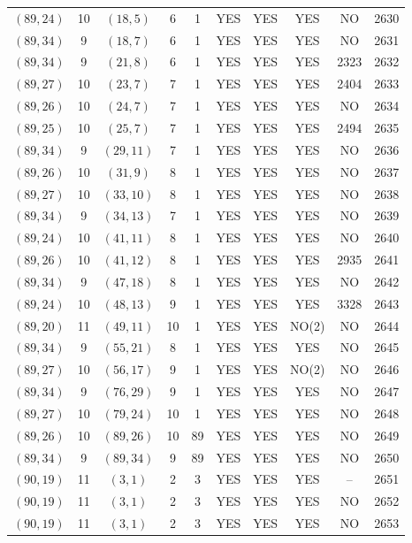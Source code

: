 \begin{longtable}{|c|c|c|c|c|c|c|c|c|c|}
$(89, 24)$ & 10 & $(18, 5)$ & 6 & 1 & YES & YES & YES & NO & 2630\\
$(89, 34)$ & 9 & $(18, 7)$ & 6 & 1 & YES & YES & YES & NO & 2631\\
$(89, 34)$ & 9 & $(21, 8)$ & 6 & 1 & YES & YES & YES & 2323 & 2632\\
$(89, 27)$ & 10 & $(23, 7)$ & 7 & 1 & YES & YES & YES & 2404 & 2633\\
$(89, 26)$ & 10 & $(24, 7)$ & 7 & 1 & YES & YES & YES & NO & 2634\\
$(89, 25)$ & 10 & $(25, 7)$ & 7 & 1 & YES & YES & YES & 2494 & 2635\\
$(89, 34)$ & 9 & $(29, 11)$ & 7 & 1 & YES & YES & YES & NO & 2636\\
$(89, 26)$ & 10 & $(31, 9)$ & 8 & 1 & YES & YES & YES & NO & 2637\\
$(89, 27)$ & 10 & $(33, 10)$ & 8 & 1 & YES & YES & YES & NO & 2638\\
$(89, 34)$ & 9 & $(34, 13)$ & 7 & 1 & YES & YES & YES & NO & 2639\\
$(89, 24)$ & 10 & $(41, 11)$ & 8 & 1 & YES & YES & YES & NO & 2640\\
$(89, 26)$ & 10 & $(41, 12)$ & 8 & 1 & YES & YES & YES & 2935 & 2641\\
$(89, 34)$ & 9 & $(47, 18)$ & 8 & 1 & YES & YES & YES & NO & 2642\\
$(89, 24)$ & 10 & $(48, 13)$ & 9 & 1 & YES & YES & YES & 3328 & 2643\\
$(89, 20)$ & 11 & $(49, 11)$ & 10 & 1 & YES & YES & NO(2) & NO & 2644\\
$(89, 34)$ & 9 & $(55, 21)$ & 8 & 1 & YES & YES & YES & NO & 2645\\
$(89, 27)$ & 10 & $(56, 17)$ & 9 & 1 & YES & YES & NO(2) & NO & 2646\\
$(89, 34)$ & 9 & $(76, 29)$ & 9 & 1 & YES & YES & YES & NO & 2647\\
$(89, 27)$ & 10 & $(79, 24)$ & 10 & 1 & YES & YES & YES & NO & 2648\\
$(89, 26)$ & 10 & $(89, 26)$ & 10 & 89 & YES & YES & YES & NO & 2649\\
$(89, 34)$ & 9 & $(89, 34)$ & 9 & 89 & YES & YES & YES & NO & 2650\\
$(90, 19)$ & 11 & $(3, 1)$ & 2 & 3 & YES & YES & YES & -- & 2651\\
$(90, 19)$ & 11 & $(3, 1)$ & 2 & 3 & YES & YES & YES & NO & 2652\\
$(90, 19)$ & 11 & $(3, 1)$ & 2 & 3 & YES & YES & YES & NO & 2653\\

\end{longtable}
